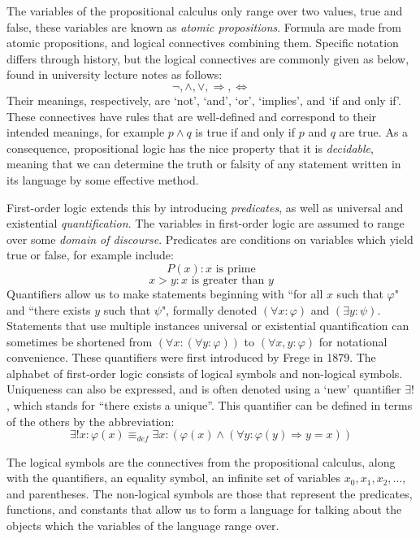 \documentclass[11pt]{report}
\newcommand{\eqdef}{\equiv_\mathit{def}}
\theoremstyle{definition}
\theoremstyle{theorem}
\theoremstyle{lemma}
\begin{document}
The variables of the propositional calculus only range over two values, true and false, these variables are known as \emph{atomic propositions}. 
Formula are made from atomic propositions, and logical connectives combining them. Specific notation differs through history, but the logical connectives are commonly given as below, found in university lecture notes \cite[p.~2]{beckert} as follows:
$$\neg, \wedge, \vee,\Rightarrow,\Leftrightarrow$$
Their meanings, respectively, are `not', `and', `or', `implies', and `if and only if'. 
These connectives have rules that are well-defined and correspond to their intended meanings, for example $p \wedge q$ is true if and only if $p$ and $q$ are true.  
As a consequence, propositional logic has the nice property that it is \emph{decidable}, meaning that we can determine the truth or falsity of any statement written in its language by some effective method.

First-order logic extends this by introducing \emph{predicates}, as well as universal and existential \emph{quantification}. 
The variables in first-order logic are assumed to range over some \emph{domain of discourse}.
Predicates are conditions on variables which yield true or false, for example include:  
$$P(x) : x \text{ is prime}$$
$$ x > y : x \text{ is greater than } y$$
Quantifiers allow us to make statements beginning with ``for all $x$ such that $\varphi$" and ``there exists $y$ such that $\psi$", formally denoted $(\forall x:\varphi)$ and $(\exists y:\psi)$. 
Statements that use multiple instances universal or existential quantification can sometimes be shortened from $(\forall x:(\forall y: \varphi))$ to $(\forall x,y: \varphi)$ for notational convenience.
These quantifiers were first introduced by Frege \cite{frege} in 1879.
The alphabet of first-order logic consists of logical symbols and non-logical symbols.
Uniqueness can also be expressed, and is often denoted using a `new' quantifier $\exists!$, which stands for ``there exists a unique''. 
This quantifier can be defined in terms of the others by the abbreviation:
$$\exists!x:\varphi(x) \eqdef \exists x: (\varphi(x) \wedge (\forall y: \varphi(y) \Rightarrow y=x))$$


The logical symbols are the connectives from the propositional calculus, along with the quantifiers, an equality symbol, an infinite set of variables $x_0, x_1, x_2,\ldots$, and parentheses.
The non-logical symbols are those that represent the predicates, functions, and constants that allow us to form a language for talking about the objects which the variables of the language range over.
\end{document}

